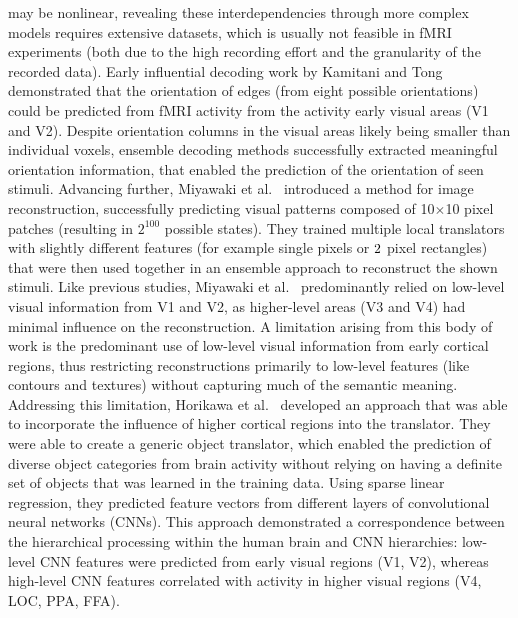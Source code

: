 may be nonlinear, revealing these interdependencies through more complex models requires extensive datasets, which is usually not feasible in fMRI experiments (both due to the high recording effort and the granularity of the recorded data). Early influential decoding work by Kamitani and Tong~\cite{kamitaniDecodingVisualSubjective2005} demonstrated that the orientation of edges (from eight possible orientations) could be predicted from fMRI activity from the activity early visual areas (V1 and V2). 
Despite orientation columns in the visual areas likely being smaller than individual voxels, ensemble decoding methods successfully extracted meaningful orientation information, that enabled the prediction of the orientation of seen stimuli. Advancing further, Miyawaki et al.~\cite{miyawakiVisualImageReconstruction2008} introduced a method for image reconstruction, successfully predicting visual patterns composed of 10$\times$10 pixel patches (resulting in $2^{100}$ possible states). They trained multiple local translators with slightly different features (for example single pixels or $2\time1$ pixel rectangles) that were then used together in an ensemble approach to reconstruct the shown stimuli. Like previous studies, Miyawaki et al.~ predominantly relied on low-level visual information from V1 and V2, as higher-level areas (V3 and V4) had minimal influence on the reconstruction. 
A limitation arising from this body of work is the predominant use of low-level visual information from early cortical regions, thus restricting reconstructions primarily to low-level features (like contours and textures) without capturing much of the semantic meaning. Addressing this limitation, Horikawa et al.~\cite{horikawaGenericDecodingSeen2017} developed an approach that was able to incorporate the influence of higher cortical regions into the translator. They were able to create a generic object translator, which enabled the prediction of diverse object categories from brain activity without relying on having a definite set of objects that was learned in the training data. Using sparse linear regression, they predicted feature vectors from different layers of convolutional neural networks (CNNs). This approach demonstrated a correspondence between the hierarchical processing within the human brain and CNN hierarchies: low-level CNN features were predicted from early visual regions (V1, V2), whereas high-level CNN features correlated with activity in higher visual regions (V4, LOC, PPA, FFA).

